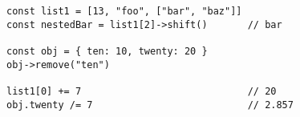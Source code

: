 \vspace{-2.5em}
\begin{center}
\begin{minipage}[t]{1\textwidth}
\begin{listing}[H]
\begin{spacing}{0.6}
\begin{verbatim}
const list1 = [13, "foo", ["bar", "baz"]]
const nestedBar = list1[2]->shift()       // bar

const obj = { ten: 10, twenty: 20 }
obj->remove("ten")

list1[0] += 7                             // 20
obj.twenty /= 7                           // 2.857
\end{verbatim}
\end{spacing}
\end{listing}
\end{minipage}
\end{center}
